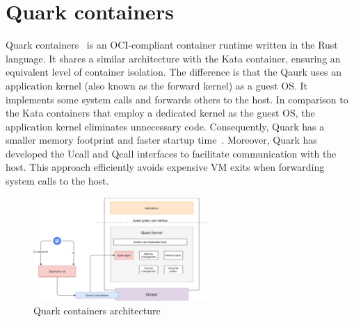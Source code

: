 \section{Quark containers}
Quark containers~\cite*{quark} is an OCI-compliant container runtime written in the Rust language. It shares a similar architecture with the Kata container, ensuring an equivalent level of container isolation. 
The difference is that the Qaurk uses an application kernel (also known as the forward kernel) as a guest OS. It implements some system calls and forwards others to the host. In comparison to the Kata containers that employ a dedicated kernel as the guest OS, 
the application kernel eliminates unnecessary code. Consequently, Quark has a smaller memory footprint and faster startup time~\cite*{quark_performance_report}. Moreover, Quark has developed the Ucall and Qcall interfaces to facilitate communication with the host. This approach efficiently avoids expensive VM exits when 
forwarding system calls to the host.

\begin{figure}[htp]
  \centering
  \includegraphics[width=0.6\textwidth]{images/QUARK_ARCH.PNG}
  \caption[Quark containers architecture]{Quark containers architecture}
  \label{fig:QUARK_ARCH}
\end{figure}


